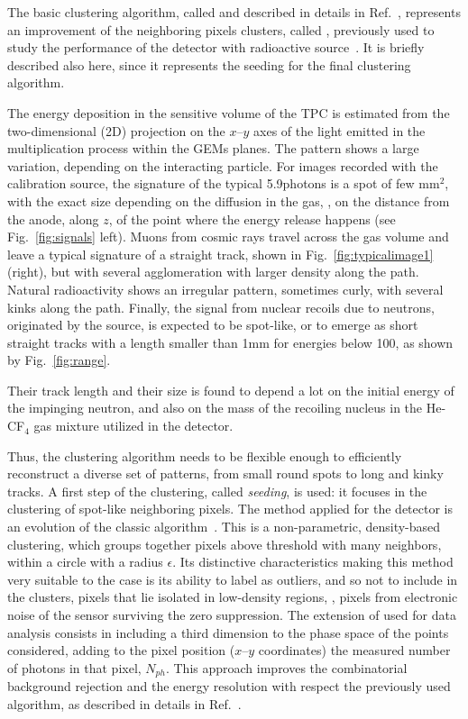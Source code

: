 The basic clustering algorithm, called \idbscan and described in
details in Ref.~\cite{iDBSCAN}, represents an improvement of the
neighboring pixels clusters, called \nnc, previously used to study the
performance of the \lemon detector with \fe radioactive
source~\cite{bib:fe55}. It is briefly described also here, since it
represents the seeding for the final clustering algorithm.

The energy deposition in the sensitive volume of the TPC is estimated
from the two-dimensional (2D) projection on the $x$--$y$ axes of the
light emitted in the multiplication process within the GEMs
planes. The pattern shows a large variation, depending on the
interacting particle. For images recorded with the \fe calibration
source, the signature of the typical 5.9\keV photons is a spot of few
mm$^2$, with the exact size depending on the diffusion in the
gas, \ie, on the distance from the anode, along $z$, of the point
where the energy release happens (see Fig.~\ref{fig:signals}
left). Muons from cosmic rays travel across the gas volume and leave a
typical signature of a straight track, shown in
Fig.~\ref{fig:typicalimage1} (right), but with several agglomeration
with larger density along the path. Natural radioactivity shows an
irregular pattern, sometimes curly, with several kinks along the
path. Finally, the signal from nuclear recoils due to neutrons,
originated by the \ambe source, is expected to be spot-like, or to
emerge as short straight tracks with a length smaller than 1\unit{mm}
for energies below 100\keV, as shown by Fig.~\ref{fig:range}.

Their track length and their size is found to depend a lot on the
initial energy of the impinging neutron, and also on the mass of the
recoiling nucleus in the He-CF$_4$ gas mixture utilized in
the \lemon detector.

Thus, the clustering algorithm needs to be flexible enough to
efficiently reconstruct a diverse set of patterns, from small round
spots to long and kinky tracks. A first step of the clustering,
called \textit{seeding}, is used: it focuses in the clustering of
spot-like neighboring pixels.  The method applied for the \lemon
detector is an evolution of the classic \dbscan
algorithm~\cite{dbscan}.  This is a non-parametric, density-based
clustering, which groups together pixels above threshold with many
neighbors, within a circle with a radius $\epsilon$. Its distinctive
characteristics making this method very suitable to the \lemon case is
its ability to label as outliers, and so not to include in the
clusters, pixels that lie isolated in low-density regions, \ie, pixels
from electronic noise of the sensor surviving the zero
suppression. The extension of \dbscan used for \lemon data analysis
consists in including a third dimension to the phase space of the
points considered, adding to the pixel position ($x$--$y$ coordinates)
the measured number of photons in that pixel, $N_{ph}$.  This approach
improves the combinatorial background rejection and the energy
resolution with respect the previously used \nnc algorithm, as
described in details in Ref.~\cite{iDBSCAN}.

